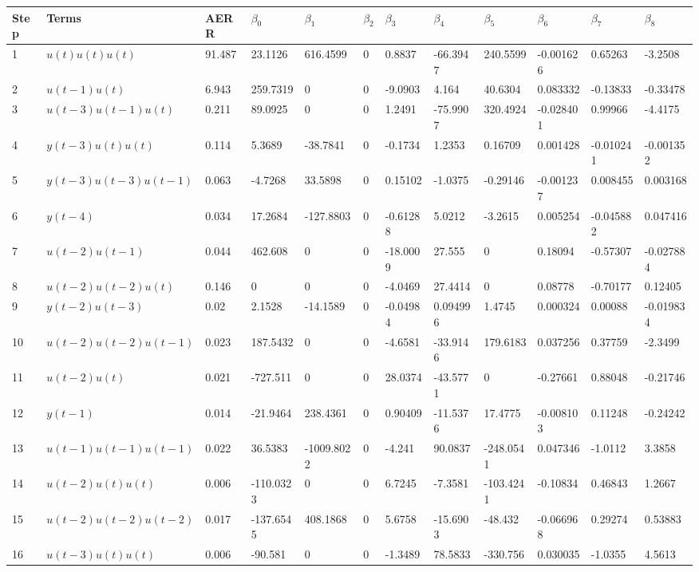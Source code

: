 \begin{tabular}{llllllllllll}
Step & Terms & AERR & $\beta_{0}$ & $\beta_{1}$ & $\beta_{2}$ & $\beta_{3}$ & $\beta_{4}$ & $\beta_{5}$ & $\beta_{6}$ & $\beta_{7}$ & $\beta_{8}$ \\ 
\hline 
1 & $u(t)u(t)u(t)$ & 91.487 & 23.1126 & 616.4599 & 0 & 0.8837 & -66.3947 & 240.5599 & -0.001626 & 0.65263 & -3.2508 \\ 
2 & $u(t-1)u(t)$ & 6.943 & 259.7319 & 0 & 0 & -9.0903 & 4.164 & 40.6304 & 0.083332 & -0.13833 & -0.33478 \\ 
3 & $u(t-3)u(t-1)u(t)$ & 0.211 & 89.0925 & 0 & 0 & 1.2491 & -75.9907 & 320.4924 & -0.028401 & 0.99966 & -4.4175 \\ 
4 & $y(t-3)u(t)u(t)$ & 0.114 & 5.3689 & -38.7841 & 0 & -0.1734 & 1.2353 & 0.16709 & 0.001428 & -0.010241 & -0.001352 \\ 
5 & $y(t-3)u(t-3)u(t-1)$ & 0.063 & -4.7268 & 33.5898 & 0 & 0.15102 & -1.0375 & -0.29146 & -0.001237 & 0.008455 & 0.003168 \\ 
6 & $y(t-4)$ & 0.034 & 17.2684 & -127.8803 & 0 & -0.61288 & 5.0212 & -3.2615 & 0.005254 & -0.045882 & 0.047416 \\ 
7 & $u(t-2)u(t-1)$ & 0.044 & 462.608 & 0 & 0 & -18.0009 & 27.555 & 0 & 0.18094 & -0.57307 & -0.027884 \\ 
8 & $u(t-2)u(t-2)u(t)$ & 0.146 & 0 & 0 & 0 & -4.0469 & 27.4414 & 0 & 0.08778 & -0.70177 & 0.12405 \\ 
9 & $y(t-2)u(t-3)$ & 0.02 & 2.1528 & -14.1589 & 0 & -0.04984 & 0.094996 & 1.4745 & 0.000324 & 0.00088 & -0.019834 \\ 
10 & $u(t-2)u(t-2)u(t-1)$ & 0.023 & 187.5432 & 0 & 0 & -4.6581 & -33.9146 & 179.6183 & 0.037256 & 0.37759 & -2.3499 \\ 
11 & $u(t-2)u(t)$ & 0.021 & -727.511 & 0 & 0 & 28.0374 & -43.5771 & 0 & -0.27661 & 0.88048 & -0.21746 \\ 
12 & $y(t-1)$ & 0.014 & -21.9464 & 238.4361 & 0 & 0.90409 & -11.5376 & 17.4775 & -0.008103 & 0.11248 & -0.24242 \\ 
13 & $u(t-1)u(t-1)u(t-1)$ & 0.022 & 36.5383 & -1009.8022 & 0 & -4.241 & 90.0837 & -248.0541 & 0.047346 & -1.0112 & 3.3858 \\ 
14 & $u(t-2)u(t)u(t)$ & 0.006 & -110.0323 & 0 & 0 & 6.7245 & -7.3581 & -103.4241 & -0.10834 & 0.46843 & 1.2667 \\ 
15 & $u(t-2)u(t-2)u(t-2)$ & 0.017 & -137.6545 & 408.1868 & 0 & 5.6758 & -15.6903 & -48.432 & -0.066968 & 0.29274 & 0.53883 \\ 
16 & $u(t-3)u(t)u(t)$ & 0.006 & -90.581 & 0 & 0 & -1.3489 & 78.5833 & -330.756 & 0.030035 & -1.0355 & 4.5613 \\ 
\hline 
\end{tabular}
